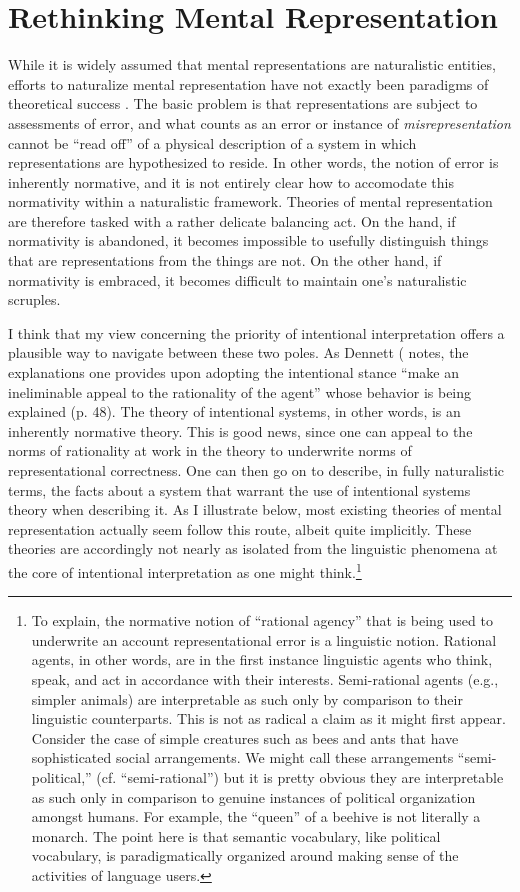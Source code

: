 \section{Rethinking Mental Representation}

While it is widely assumed that mental representations are naturalistic entities, efforts to naturalize mental representation have not exactly been paradigms of theoretical success \citep[][Ch. 3]{Horwich:2005}. The basic problem is that representations are subject to assessments of error, and what counts as an error or instance of \textit{misrepresentation} cannot be ``read off'' of a physical description of a system in which representations are hypothesized to reside. In other words, the notion of error is inherently normative, and it is not entirely clear how to accomodate this normativity within a naturalistic framework. Theories of mental representation are therefore tasked with a rather delicate balancing act. On the hand, if normativity is abandoned, it becomes impossible to usefully distinguish things that are representations from the things are not. On the other hand, if normativity is embraced, it becomes difficult to maintain one's naturalistic scruples. 

I think that my view concerning the priority of intentional interpretation offers a plausible way to navigate between these two poles. As Dennett (\citeyear{Dennett:1987)} notes, the explanations one provides upon adopting the intentional stance ``make an ineliminable appeal to the rationality of the agent'' whose behavior is being explained (p. 48). The theory of intentional systems, in other words, is an inherently normative theory. This is good news, since one can appeal to the norms of rationality at work in the theory to underwrite norms of representational correctness. One can then go on to describe, in fully naturalistic terms, the facts about a system that warrant the use of intentional systems theory when describing it. As I illustrate below, most existing theories of mental representation actually seem follow this route, albeit quite implicitly. These theories are accordingly not nearly as isolated from the linguistic phenomena at the core of intentional interpretation as one might think.\footnote{To explain, the normative notion of ``rational agency'' that is being used to underwrite an account representational error is a linguistic notion. Rational agents, in other words, are in the first instance linguistic agents who think, speak, and act in accordance with their interests. Semi-rational agents (e.g., simpler animals) are interpretable as such only by comparison to their linguistic counterparts. This is not as radical a claim as it might first appear. Consider the case of simple creatures such as bees and ants that have sophisticated social arrangements. We might call these arrangements ``semi-political,'' (cf. ``semi-rational'') but it is pretty obvious they are interpretable as such only in comparison to genuine instances of political organization amongst humans. For example, the ``queen'' of a beehive is not literally a monarch. The point here is that semantic vocabulary, like political vocabulary, is paradigmatically organized around making sense of the activities of language users.}

